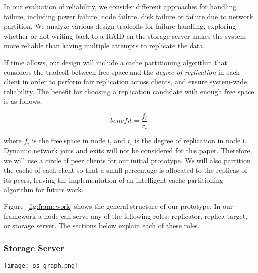 

In our evaluation of reliability, we consider different
approaches for handling failure, including power failure,
node failure, disk failure or failure due to network partition.
We analyze various design tradeoffs for failure handling, exploring
whether or not writing back to a RAID on the storage server makes
the system more reliable than having multiple attempts to
replicate the data.

If time allows, our design will include a cache
partitioning algorithm that considers the tradeoff between
free space and the \textit{degree of replication} in each
client in order to perform fair replication across clients,
and ensure system-wide reliability. The benefit for
choosing a replication candidate with enough free space is
as follows:

\begin{equation}
	benefit=\frac{f_i}{r_i}
\end{equation}

where $f_i$
is the free space in node i, and $r_i$ is the degree
of replication in node i. Dynamic network joins and exits
will not be considered for this paper. Therefore, we will
use a circle of peer clients for our initial prototype.
We will also partition the cache of each client so that
a small percentage is allocated to the replicas of its
peers, leaving the implementation of an intelligent
cache partitioning algorithm for future work. 


Figure~\ref{fig:framework} shows the general structure of our prototype.
In our framework a node can serve any of the following roles:
replicator, replica target, or storage server. The sections
below explain each of these roles.

\subsubsection{Storage Server}
\begin{figure*}[t]
  \centering \texttt{[image: os\_graph.png]}
  \caption{The general structure of our prototype. A node can serve
	   any of the following roles: replicator, replica target, or storage
	   server.}
  \label{fig:framework}
\end{figure*}

